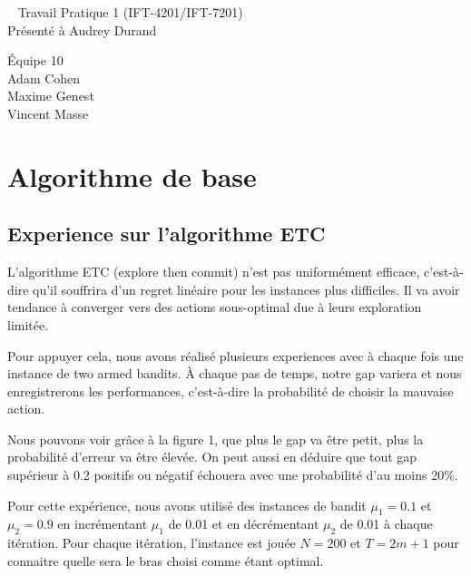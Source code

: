 \documentclass[letterpaper,11pt]{article}
\begin{document}
\begin{center}
~
\vfill
\LARGE{Travail Pratique 1 (IFT-4201/IFT-7201)}\\[0.4cm]

\Large{Présenté à Audrey Durand}

\vfill
\large{Équipe 10 \\ Adam Cohen \\ Maxime Genest \\ Vincent Masse}

\vfill
\thispagestyle{empty}

\end{center}
\clearpage

\pagestyle{fancy}


%

\section{Algorithme de base}

\subsection{Experience sur l'algorithme ETC}
L'algorithme ETC (explore then commit) n'est pas uniformément efficace, c'est-à-dire qu'il souffrira d'un regret linéaire pour les instances plus difficiles.
Il va avoir tendance à converger vers des actions sous-optimal due à leurs exploration limitée.

Pour appuyer cela, nous avons réalisé plusieurs experiences avec à chaque fois une instance de two armed bandits.
À chaque pas de temps, notre gap variera et nous enregistrerons les performances, c'est-à-dire la probabilité de choisir la mauvaise action.

Nous pouvons voir grâce à la figure 1, que plus le gap va être petit, plus la probabilité d'erreur va être élevée. On peut aussi en déduire que tout gap supérieur à 0.2 positifs ou négatif échouera avec une probabilité d’au moins 20\%.

Pour cette expérience, nous avons utilisé des instances de bandit $\mu_1 = 0.1$ et $\mu_2 = 0.9$ en incrémentant $\mu_1$ de 0.01 et en décrémentant $\mu_2$ de 0.01 à chaque itération. Pour chaque itération, l'instance est jouée $N = 200$ et $T = 2 m +1$ pour connaitre quelle sera le bras choisi comme étant optimal.
\end{document}
